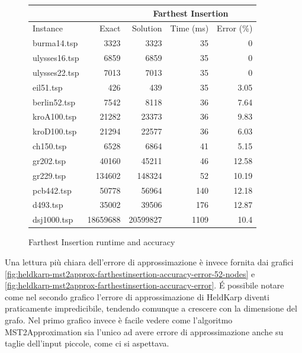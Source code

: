 \begin{figure}[H]
    \centering

    \begin{tabular}{lrrrr}
    \toprule
    \multicolumn{2}{c}{ } & \multicolumn{3}{c}{Farthest Insertion} \\
    \hline
    Instance & Exact & Solution &   Time (ms) &   Error (\%) \\
    \hline
    burma14.tsp   &     3323 &       3323 &          35 &        0    \\
    ulysses16.tsp &     6859 &       6859 &          35 &        0    \\
    ulysses22.tsp &     7013 &       7013 &          35 &        0    \\
    eil51.tsp     &      426 &        439 &          35 &        3.05 \\
    berlin52.tsp  &     7542 &       8118 &          36 &        7.64 \\
    kroA100.tsp   &    21282 &      23373 &          36 &        9.83 \\
    kroD100.tsp   &    21294 &      22577 &          36 &        6.03 \\
    ch150.tsp     &     6528 &       6864 &          41 &        5.15 \\
    gr202.tsp     &    40160 &      45211 &          46 &       12.58 \\
    gr229.tsp     &   134602 &     148324 &          52 &       10.19 \\
    pcb442.tsp    &    50778 &      56964 &         140 &       12.18 \\
    d493.tsp      &    35002 &      39506 &         176 &       12.87 \\
    dsj1000.tsp   & 18659688 &   20599827 &        1109 &       10.4  \\
    \bottomrule
    \end{tabular}

    \caption{Farthest Insertion runtime and accuracy}
    \label{table:farthest-insertion-runtime-accuracy}
\end{figure}

Una lettura più chiara dell'errore di approssimazione è invece
fornita dai grafici
\ref{fig:heldkarp-mst2approx-farthestinsertion-accuracy-error-52-nodes}
 e \ref{fig:heldkarp-mst2approx-farthestinsertion-accuracy-error}.
\'E possibile notare come nel
secondo grafico l'errore di approssimazione di HeldKarp diventi
praticamente impredicibile, tendendo comunque a crescere con la
dimensione del grafo. Nel primo grafico invece è facile vedere
come l'algoritmo MST2Approximation sia l'unico ad avere errore
di approssimazione anche su taglie dell'input piccole,
come ci si aspettava.

